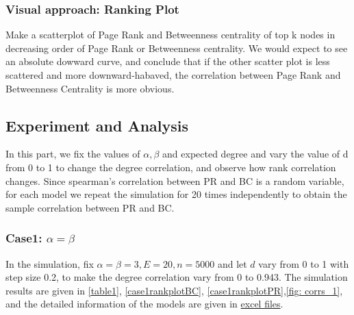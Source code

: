 \documentclass{article}
\begin{document}
\subsubsection{Visual approach: Ranking Plot}
\par Make a scatterplot of Page Rank and Betweenness centrality of top k nodes in decreasing order of Page Rank or Betweenness centrality. We would expect to see an absolute dowward curve, and conclude that if the other scatter plot is less scattered and more downward-habaved, the correlation between Page Rank and Betweenness Centrality is more obvious.

\subsection{Experiment and Analysis}
\par In this part, we fix the values of $\alpha, \beta$ and expected degree and vary the value of d from 0 to 1 to change the degree correlation, and observe how rank correlation changes. Since spearman's correlation between PR and BC is a random variable, for each model we repeat the simulation for 20 times independently to obtain the sample correlation between PR and BC.

\subsubsection{Case1: $\alpha=\beta$}
\par In the simulation, fix $\alpha=\beta=3, E=20, n=5000$ and let $d$ vary from 0 to 1 with step size 0.2, to make the degree correlation vary from 0 to 0.943. The simulation results are given in \ref{table1}, \ref{case1rankplotBC}, \ref{case1rankplotPR},\ref{fig: corrs_1}, and the detailed information of the models are given in \href{https://github.com/leahwu/DCM_simulaiton_and_analysis/tree/master/output_data/part1_case1}{excel files}.
\end{document}
